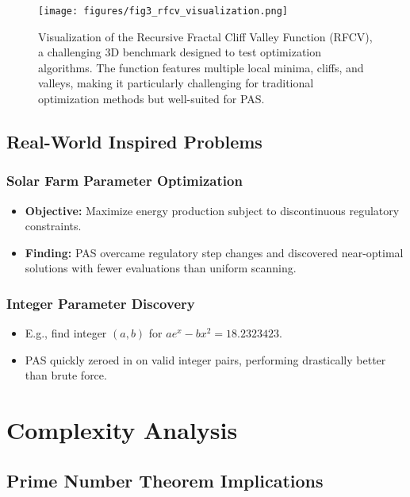 \documentclass[10pt,twocolumn,letterpaper]{article}
\begin{document}
\begin{figure}[t]
    \centering
    \texttt{[image: figures/fig3\_rfcv\_visualization.png]}
    \caption{Visualization of the Recursive Fractal Cliff Valley Function (RFCV), a challenging 3D benchmark designed to test optimization algorithms. The function features multiple local minima, cliffs, and valleys, making it particularly challenging for traditional optimization methods but well-suited for PAS.}
    \label{fig:rfcv_visualization}
\end{figure}

\subsection{Real-World Inspired Problems}

\subsubsection{Solar Farm Parameter Optimization}
\begin{itemize}
    \item \textbf{Objective:} Maximize energy production subject to discontinuous regulatory constraints.
    \item \textbf{Finding:} PAS overcame regulatory step changes and discovered near-optimal solutions with fewer evaluations than uniform scanning.
\end{itemize}

\subsubsection{Integer Parameter Discovery}
\begin{itemize}
    \item E.g., find integer $(a, b)$ for $a e^x - b x^2 = 18.2323423$.
    \item PAS quickly zeroed in on valid integer pairs, performing drastically better than brute force.
\end{itemize}

\section{Complexity Analysis}

\subsection{Prime Number Theorem Implications}
\end{document}
